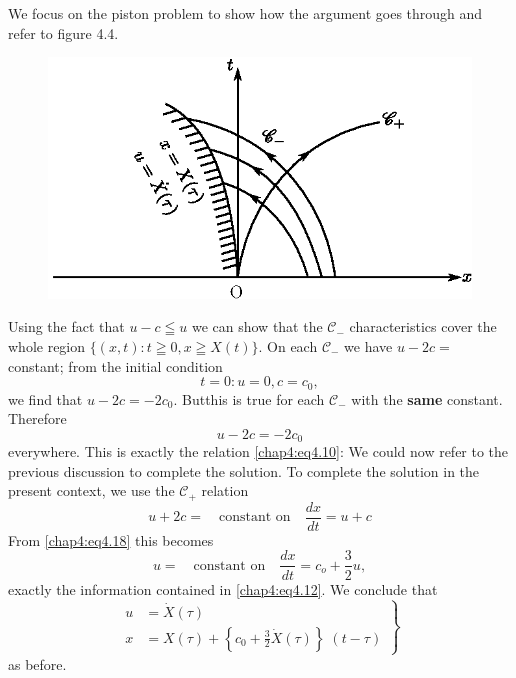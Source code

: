 We focus on the piston problem to show how the argument goes through and refer to figure 4.4.
\begin{figure}[H]
\centering
\includegraphics{figures/fig61-4.4.eps}
\caption{}
\label{chap1:fig4.4}
\end{figure}

Using the fact that $u-c\leqq u$ we can show that the $\mathscr{C}_-$ characteristics cover the whole region $\{(x,t):t\geqq 0,x\geqq X(t)\}$. On each $\mathscr{C}_-$ we have $u-2c=$ constant; from the initial condition 
$$
t=0:u=0,c=c_0,
$$
we find that $u-2c=-2c_0$. But\pageoriginale this is true for each $\mathscr{C}_-$ with the {\bf same} constant. Therefore 
\begin{equation}
u-2c=-2c_0\tag{4.18}\label{chap4:eq4.18}
\end{equation}
everywhere. This is exactly the relation \eqref{chap4:eq4.10}: We could now refer to the previous discussion to complete the solution. To complete the solution in the present context, we use the $\mathscr{C}_+$ relation
$$
u+2c=\quad\text{constant on}\quad\frac{dx}{dt}=u+c
$$
From \eqref{chap4:eq4.18} this becomes
$$
u=\quad\text{constant on}\quad\frac{dx}{dt}=c_o + \frac{3}{2}u, 
$$
exactly the information contained in \eqref{chap4:eq4.12}. We conclude that 
\begin{equation}
\left.
\begin{aligned}
u &= \dot{X}(\tau)\\
x &= X(\tau)+\left\{c_0+\frac{3}{2}\dot{X}(\tau)\right\}\;(t-\tau)
\end{aligned}
\right\}\tag{4.19}\label{chap4:eq4.19}
\end{equation}
as before.


